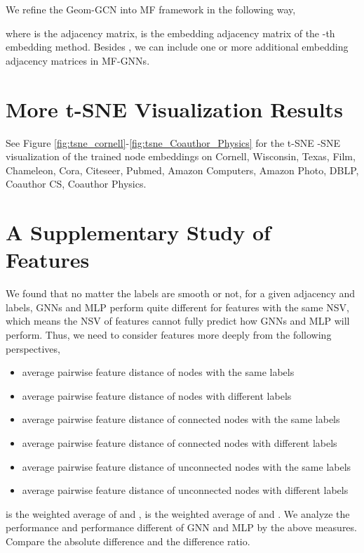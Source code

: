 \documentclass{article}
\newcommand{\0}{{\boldsymbol{0}}}
\newcommand{\6}{{\partial}}
\newcommand{\8}{{\infty}}
\newcommand{\4}{{\nabla}}
\begin{document}
We refine the Geom-GCN into MF framework in the following way,

where  is the adjacency matrix,  is the embedding adjacency matrix of the -th embedding method. Besides , we can include one or more additional embedding adjacency matrices  in MF-GNNs.

\section{More t-SNE Visualization Results}
See Figure \ref{fig:tsne_cornell}-\ref{fig:tsne_Coauthor_Physics} for the t-SNE -SNE visualization of the trained node embeddings on Cornell, Wisconsin, Texas, Film, Chameleon, Cora, Citeseer, Pubmed, Amazon Computers, Amazon Photo, DBLP, Coauthor CS, Coauthor Physics.


\section{A Supplementary Study of Features}

We found that no matter the labels are smooth or not, for a given adjacency and labels, GNNs and MLP perform quite different for features with the same NSV, which means the NSV of features cannot fully predict how GNNs and MLP will perform. Thus, we need to consider features more deeply from the following perspectives,
\begin{itemize}
    \item  average pairwise feature distance of nodes with the same labels
    \item  average pairwise feature distance of nodes with different labels
    \item  average pairwise feature distance of connected nodes with the same labels
    \item  average pairwise feature distance of connected nodes with different labels
    \item  average pairwise feature distance of unconnected nodes with the same labels
    \item  average pairwise feature distance of unconnected nodes with different labels
\end{itemize}
 is the weighted average of  and  ,  is the weighted average of  and . We analyze the performance and performance different of GNN and MLP by the above measures. Compare the absolute difference and the difference ratio.
\end{document}
